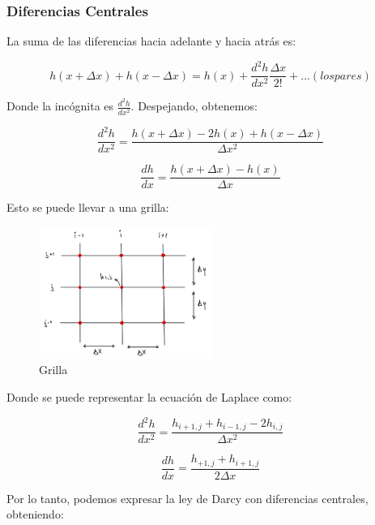 \subsubsection{Diferencias Centrales}

La suma de las diferencias hacia adelante y hacia atrás es:

\begin{equation}
    h(x + \Delta x) + h(x - \Delta x) = h(x) + \frac{d^2h}{dx^2}\frac{\Delta x}{2!} + ...(los pares)
\end{equation}

Donde la incógnita es $\frac{d^2h}{dx^2}$. Despejando, obtenemos:

\begin{equation}
    \frac{d^2h}{dx^2} = \frac{h(x + \Delta x) - 2h(x) + h(x - \Delta x)}{\Delta x^2}
\end{equation}

\begin{equation}
    \frac{dh}{dx} = \frac{h(x + \Delta x) - h(x)}{\Delta x}
\end{equation}

Esto se puede llevar a una grilla:

\begin{figure}[H]
    \centering
    \includegraphics[width=0.5\textwidth]{FOTOS/grilla.jpg}
    \caption{Grilla}
\end{figure}

Donde se puede representar la ecuación de Laplace como:

\begin{equation}
    \frac{d^2h}{dx^2} = \frac{h_{i+1,j} + h_{i-1,j} - 2h_{i,j}}{\Delta x^2}
\end{equation}

\begin{equation}
    \frac{dh}{dx} = \frac{h_{+1,j} + h_{i+1,j}}{2\Delta x}
\end{equation}

Por lo tanto, podemos expresar la ley de Darcy con diferencias centrales, obteniendo:

